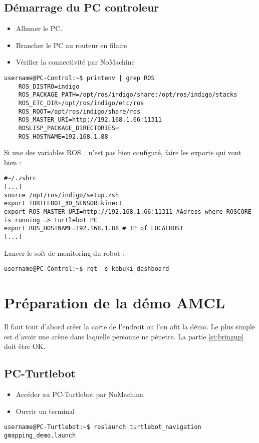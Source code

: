 \documentclass[11pt, a4paper,notitlepage]{article}
\begin{document}
\subsection{Démarrage du PC controleur}
\begin{itemize}
  \item Allumer le PC.
  \item Brancher le PC au routeur en filaire
  \item Vérifier la connectivité par NoMachine
\end{itemize}

\begin{lstlisting}[style=Bash]
  username@PC-Control:~$ printenv | grep ROS
    ROS_DISTRO=indigo
    ROS_PACKAGE_PATH=/opt/ros/indigo/share:/opt/ros/indigo/stacks
    ROS_ETC_DIR=/opt/ros/indigo/etc/ros
    ROS_ROOT=/opt/ros/indigo/share/ros
    ROS_MASTER_URI=http://192.168.1.66:11311
    ROSLISP_PACKAGE_DIRECTORIES=
    ROS_HOSTNAME=192.168.1.88
\end{lstlisting}

Si une des variables ROS\_ n'est pas bien configuré, faire les exports qui vont bien :
\begin{lstlisting}[style=Bash]
#~/.zshrc
[...]
source /opt/ros/indigo/setup.zsh
export TURTLEBOT_3D_SENSOR=kinect
export ROS_MASTER_URI=http://192.168.1.66:11311 #Adress where ROSCORE is running => turtlebot PC
export ROS_HOSTNAME=192.168.1.88 # IP of LOCALHOST
[...]
\end{lstlisting}

Lancer le soft de monitoring du robot :
\begin{lstlisting}[style=Bash]
  username@PC-Control:~$ rqt -s kobuki_dashboard
\end{lstlisting}

\section{Préparation de la démo AMCL}\label{st:gmapping}
Il faut tout d'abord créer la carte de l'endroit ou l'on afit la démo. Le plus simple est d'avoir une arène dans laquelle personne ne pénetre. La partie \ref{st:bringup} doit être OK.
\subsection{PC-Turtlebot}
\begin{itemize}
  \item Accéder au PC-Turtlebot par NoMachine.
  \item Ouvrir un terminal
\end{itemize}
\begin{lstlisting}[style=Bash]
  username@PC-Turtlebot:~$ roslaunch turtlebot_navigation gmapping_demo.launch
\end{lstlisting}
\end{document}
